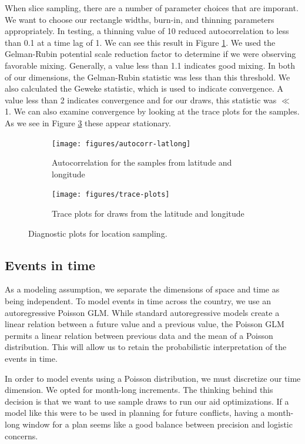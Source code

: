 \documentclass{article} %
\begin{document}
When slice sampling, there are a number of parameter choices that are imporant. We want to choose our rectangle widths, burn-in, and thinning parameters appropriately. In testing, a thinning value of 10 reduced autocorrelation to less than 0.1 at a time lag of 1. We can see this result in Figure \ref{fig:autocorr}. We used the Gelman-Rubin potential scale reduction factor\cite{Gelman-Rubin} to determine if we were observing favorable mixing. Generally, a value less than 1.1 indicates good mixing. In both of our dimensions, the Gelman-Rubin statistic was less than this threshold. We also calculated the Geweke statistic, which is used to indicate convergence. A value less than 2 indicates convergence and for our draws, this statistic was $\ll$ 1. We can also examine convergence by looking at the trace plots for the samples. As we see in Figure \ref{fig:trace} these appear stationary.

\begin{figure}
  \centering
  \begin{subfigure}[b]{0.5\textwidth}
    \centering
    \texttt{[image: figures/autocorr-latlong]}
    \caption{Autocorrelation for the samples from latitude and longitude}
    \label{fig:autocorr}
  \end{subfigure}
  \begin{subfigure}[b]{0.5\textwidth}
    \centering
    \texttt{[image: figures/trace-plots]}
    \caption{Trace plots for draws from the latitude and longitude}
    \label{fig:trace}
  \end{subfigure}
  \caption{Diagnostic plots for location sampling.}
\end{figure}

\subsection{Events in time}
As a modeling assumption, we separate the dimensions of space and time as being independent. To model events in time across the country, we use an autoregressive Poisson GLM. While standard autoregressive models create a linear relation between a future value and a previous value, the Poisson GLM permits a linear relation between previous data and the mean of a Poisson distribution. This will allow us to retain the probabilistic interpretation of the events in time.

In order to model events using a Poisson distribution, we must discretize our time dimension. We opted for month-long increments. The thinking behind this decision is that we want to use sample draws to run our aid optimizations. If a model like this were to be used in planning for future conflicts, having a month-long window for a plan seems like a good balance between precision and logistic concerns.
\end{document}
